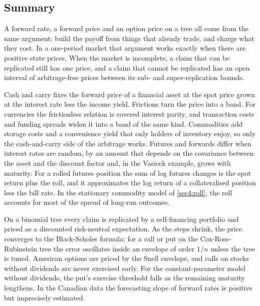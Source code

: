 \begin{chapterrefs}
\section{Summary}
\label{sec4:summary}

A forward rate, a forward price and an option price on a tree all come from the same argument: build
the payoff from things that already trade, and charge what they cost. In a one-period market that
argument works exactly when there are positive state prices. When the market is incomplete, a claim
that can be replicated still has one price, and a claim
that cannot be replicated has an open interval of arbitrage-free prices between its sub- and
super-replication bounds.

Cash and carry fixes the forward price of a financial asset at the spot price grown at the interest
rate less the income yield. Frictions turn the price into a band. For currencies the frictionless
relation is covered interest parity, and transaction costs and funding spreads widen it into a band of
the same kind. Commodities add storage costs and a convenience yield that only holders of inventory enjoy, so only the cash-and-carry side of the
arbitrage works. Futures and forwards differ when interest rates are random, by an amount that
depends on the covariance between the asset and the discount factor and, in the Vasicek example, grows
with maturity. For a rolled futures position the sum of log futures changes is the spot return plus
the roll, and it approximates the log return of a collateralised position less the bill rate. In the
stationary commodity model of \cref{sec4:roll}, the roll accounts for most of the spread of long-run
outcomes.

On a binomial tree every claim is replicated by a self-financing portfolio and priced as a
discounted risk-neutral expectation. As the steps shrink, the price converges to the Black-Scholes
formula; for a call or put on the Cox-Ross-Rubinstein tree the error oscillates inside an envelope of
order $1/n$ unless the tree is tuned. American options are priced by the Snell envelope, and calls on
stocks without dividends are never exercised early. For the constant-parameter model without dividends, the put's exercise threshold falls as the
remaining maturity lengthens. In the Canadian data the forecasting
slope of forward rates is positive but imprecisely estimated.


\end{chapterrefs}
